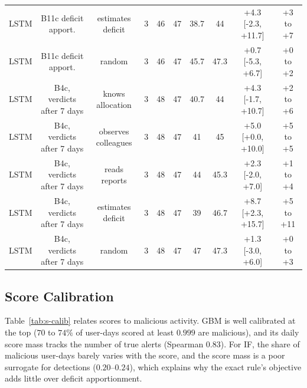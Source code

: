 \documentclass[10pt,onecolumn,letterpaper]{article}
\begin{document}
\begin{table}[!t]
{\begin{tabular}{lccccccccc}
LSTM & B11c deficit apport. & estimates deficit & 3 & 46 & 47 & 38.7 & 44 & +4.3 [-2.3, +11.7] & +3 to +7 \\
LSTM & B11c deficit apport. & random & 3 & 46 & 47 & 45.7 & 47.3 & +0.7 [-5.3, +6.7] & +0 to +2 \\
LSTM & B4c, verdicts after 7 days & knows allocation & 3 & 48 & 47 & 40.7 & 44 & +4.3 [-1.7, +10.7] & +2 to +6 \\
LSTM & B4c, verdicts after 7 days & observes colleagues & 3 & 48 & 47 & 41 & 45 & +5.0 [+0.0, +10.0] & +5 to +5 \\
LSTM & B4c, verdicts after 7 days & reads reports & 3 & 48 & 47 & 44 & 45.3 & +2.3 [-2.0, +7.0] & +1 to +4 \\
LSTM & B4c, verdicts after 7 days & estimates deficit & 3 & 48 & 47 & 39 & 46.7 & +8.7 [+2.3, +15.7] & +5 to +11 \\
LSTM & B4c, verdicts after 7 days & random & 3 & 48 & 47 & 47 & 47.3 & +1.3 [-3.0, +6.0] & +0 to +3 \\
\bottomrule
\end{tabular}}
\end{table}

\subsection{Score Calibration}
Table~\ref{tab:s-calib} relates scores to malicious activity. GBM is well calibrated at the top ($70$ to $74\%$ of user-days scored at least $0.999$ are malicious), and its daily score mass tracks the number of true alerts (Spearman $0.83$). For IF, the share of malicious user-days barely varies with the score, and the score mass is a poor surrogate for detections ($0.20$--$0.24$), which explains why the exact rule's objective adds little over deficit apportionment.
\end{document}
